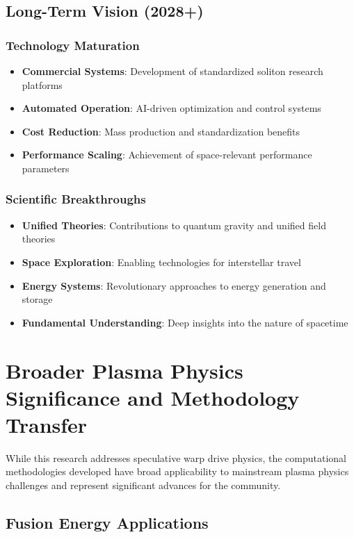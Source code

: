 \documentclass[12pt,a4paper]{article}
\begin{document}
\subsection{Long-Term Vision (2028+)}

\subsubsection{Technology Maturation}
\begin{itemize}
\item \textbf{Commercial Systems}: Development of standardized soliton research platforms
\item \textbf{Automated Operation}: AI-driven optimization and control systems
\item \textbf{Cost Reduction}: Mass production and standardization benefits
\item \textbf{Performance Scaling}: Achievement of space-relevant performance parameters
\end{itemize}

\subsubsection{Scientific Breakthroughs}
\begin{itemize}
\item \textbf{Unified Theories}: Contributions to quantum gravity and unified field theories
\item \textbf{Space Exploration}: Enabling technologies for interstellar travel
\item \textbf{Energy Systems}: Revolutionary approaches to energy generation and storage
\item \textbf{Fundamental Understanding}: Deep insights into the nature of spacetime
\end{itemize}

\section{Broader Plasma Physics Significance and Methodology Transfer}

While this research addresses speculative warp drive physics, the computational methodologies developed have broad applicability to mainstream plasma physics challenges and represent significant advances for the community.

\subsection{Fusion Energy Applications}
\end{document}
